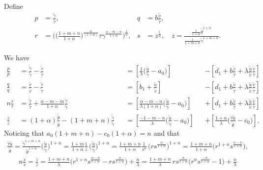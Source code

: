 \documentclass[a4paper,11pt]{article}
\def\tg{{\tilde{\gamma}}}
\def\tv{{\tilde{v}}}
\def\tth{{\tilde{\theta}}}
\def\ts{{\tilde{\tau}}}
\def\tu{{\tilde{u}}}
\def\dtg{\dot{\tilde{\gamma}}}
\def\dtv{\dot{\tilde{v}}}
\def\dtth{\dot{\tilde{\theta}}}
\def\dts{\dot{\tilde{\tau}}}
\def\dpp{\dot{p}}
\def\dqq{\dot{q}}
\def\drr{\dot{r}}
\begin{document}
Define 
\begin{equation}\label{eq:pqrsdef}
 \begin{aligned}
  p &= \frac{\tg}{\ts}, & q&=b \frac{\tv}{\ts},\\
  r &= \Big(\Big(\frac{1+m+n}{1+\alpha}\Big)^{\frac{\alpha}{(1+\alpha)}}\tau \gamma^{\frac{\alpha-m-n}{1+\alpha}}\Big)^{\frac{1}{n}} , & s&=z^{\frac{1}{n}}, \quad z=\frac{ \frac{1}{1+\alpha} \tth^{1+\alpha} }{ \frac{1}{1+m+n} \tg^{1+m+n} }.
 \end{aligned}
\end{equation}

We have
\begin{align*}
 \frac{\dpp}{p}&=\frac{\dtg}{\tg} - \frac{\dts}{\ts}& &=\left[\frac{1}{\lambda }\Big(\frac{\tu}{\tg}-a_0\Big)\right] & &-\left[d_1 + b\frac{\tv}{\ts} + \lambda\frac{\tu}{\tv}\frac{\tv}{\ts}\right]\\
 \frac{\dqq}{q}&=\frac{\dtv}{\tv} - \frac{\dts}{\ts}& &=\left[b_1 +\frac{\tu}{\tv}\right] & &-\left[d_1 + b\frac{\tv}{\ts} + \lambda\frac{\tu}{\tv}\frac{\tv}{\ts}\right]\\
 n\frac{\drr}{r}&=\frac{\dts}{\ts} +\frac{\alpha-m-m}{1+\alpha} \frac{\dtg}{\tg}& &=\left[\frac{\alpha-m-n}{\lambda(1+\alpha) }\Big(\frac{\tu}{\tg}-a_0\Big)\right]& &+\left[d_1 + b\frac{\tv}{\ts} + \lambda\frac{\tu}{\tv}\frac{\tv}{\ts}\right]\\
 \frac{\dot{z}}{z} &= (1+\alpha)\frac{\dtth}{\tth} - (1+m+n)\frac{\dtg}{\tg} & &=\left[\frac{-1-m-n}{\lambda }\Big(\frac{\tu}{\tg}-a_0\Big)\right] & &+ \left[\frac{1+\alpha}{\lambda }\Big(\frac{\ts\tu}{\tth}-c_0\Big)\right].%
\end{align*}
Noticing that $\displaystyle a_0(1+m+n)-c_0(1+\alpha)=n$ and that
\begin{align*}
 \frac{\ts\tu}{\tth} = \frac{\tg^{1+m+n}}{\tth^{1+\alpha}}\Big(\frac{\tu}{\tg}\Big)^{1+n} = \frac{1+m}{1+\alpha} \frac{1}{z}\,\Big(\frac{\tu}{\tg}\Big)^{1+n} =  \frac{1+m+n}{1+\alpha} \frac{1}{s^n}\,\Big(rs^{\frac{\alpha}{1+\alpha}}\Big)^{1+n}
 =\frac{1+m+n}{1+\alpha}\Big( r^{1+n} s^{\frac{\alpha-n}{1+\alpha}}\Big),
\end{align*}
\begin{align*}
n\frac{\dot{s}}{s} = \frac{\dot{z}}{z} = \frac{1+m+n}{\lambda}\Big(r^{1+n}s^{\frac{\alpha-n}{1+\alpha}} - rs^{\frac{\alpha}{1+\alpha}} \Big) + \frac{n}{\lambda} = \frac{1+m+n}{\lambda}\,rs^{\frac{\alpha}{1+\alpha}}\Big(r^{n}s^{\frac{-n}{1+\alpha}} - 1 \Big) + \frac{n}{\lambda}
\end{align*}
\end{document}
